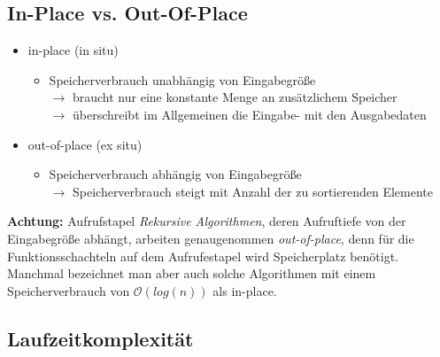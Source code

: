 \documentclass{lehramt-informatik}
\begin{document}
%

\subsection{In-Place vs. Out-Of-Place}

\begin{itemize}

%

\item in-place (in situ)

\begin{itemize}
\item Speicherverbrauch unabhängig von Eingabegröße\\
%
$\rightarrow$ braucht nur eine konstante Menge an zusätzlichem
Speicher\\
%
$\rightarrow$ überschreibt im Allgemeinen die Eingabe- mit den
Ausgabedaten
\end{itemize}

%

\item out-of-place (ex situ)

\begin{itemize}
\item Speicherverbrauch abhängig von Eingabegröße\\
%
$\rightarrow$ Speicherverbrauch steigt mit Anzahl der zu sortierenden
Elemente
\end{itemize}

\end{itemize}

\noindent
\textbf{Achtung:} Aufrufstapel  \emph{Rekursive Algorithmen}, deren
Aufruftiefe von der Eingabegröße abhängt, arbeiten genaugenommen
\emph{out-of-place}, denn für die Funktionsschachteln auf dem
Aufrufestapel wird Speicherplatz benötigt. Manchmal bezeichnet man aber
auch solche Algorithmen mit einem Speicherverbrauch von
$\mathcal{O}(log(n))$ als in-place.

%

\subsection{Laufzeitkomplexität}
\end{document}
